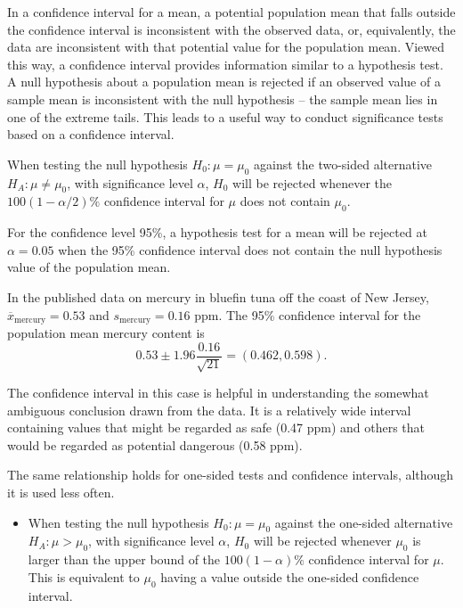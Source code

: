 \begin{spacing}{1.5}
In a confidence interval for a mean, a potential population mean that falls outside the confidence interval is inconsistent with the observed data, or, equivalently, the data are inconsistent with that potential value for the population mean.  Viewed this way, a confidence interval provides information similar to a hypothesis test.  A null hypothesis about a population mean is rejected if an observed value of a sample mean is inconsistent with the null hypothesis  -- the sample mean lies in one of the extreme tails.  This leads to a useful way to conduct significance tests based on a confidence interval.

\begin{termBox}{
{When testing the null hypothesis $H_0:\mu = \mu_0$ against the two-sided alternative $H_A: \mu \neq \mu_0$, with significance level $\alpha$, $H_0$ will be rejected whenever the $100(1-\alpha/2)\%$ confidence interval for $\mu$ does not contain $\mu_0$. 
}}
\end{termBox}
For the confidence level 95\%, a hypothesis test for a mean will be rejected at $\alpha = 0.05$ when the 95\% confidence interval does not contain the null hypothesis value of the population mean.

\begin{example}
	
In the published data on mercury in bluefin tuna off the coast of New Jersey, $\overline{x}_{\text{mercury}} = 0.53$ and $s_{\text{mercury}} = 0.16$ ppm.  The 95\% confidence interval for the population mean mercury content is 
\[
0.53 \pm 1.96 \frac{0.16}{\sqrt{21}} = (0.462, 0.598).
\]

The confidence interval in this case is helpful in understanding the somewhat ambiguous conclusion drawn from the data. It is a relatively wide interval containing values that might be regarded as safe (0.47 ppm) and others that would be regarded as potential dangerous (0.58 ppm).
\end{example}


The same relationship holds for one-sided tests and confidence intervals, although it is used less often.

\begin{termBox}{
{
\begin{itemize}
\item When testing the null hypothesis $H_0:\mu = \mu_0$ against the one-sided alternative $H_A: \mu > \mu_0$, with significance level $\alpha$, $H_0$ will be rejected whenever $\mu_0$ is larger than the upper bound of the $100(1-\alpha)\%$ confidence interval for $\mu$. This is equivalent to $\mu_0$ having a value outside the one-sided confidence interval.


\end{itemize}}}
\end{termBox}
\end{spacing}
